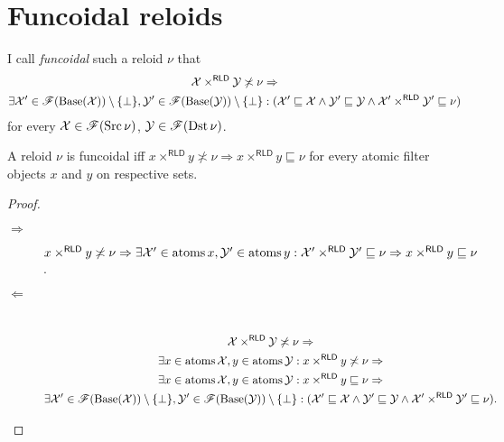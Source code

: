\section{\label{fcd-rld}Funcoidal reloids}
\begin{defn}
I call \emph{funcoidal} such a reloid $\nu$
that
\begin{multline*}
\mathcal{X}\times^{\mathsf{RLD}}\mathcal{Y}\not\asymp\nu\Rightarrow\\
\exists\mathcal{X}'\in\mathscr{F}(\operatorname{Base}(\mathcal{X}))\setminus\{\bot\},\mathcal{Y}'\in\mathscr{F}(\operatorname{Base}(\mathcal{Y}))\setminus\{\bot\}:(\mathcal{X}'\sqsubseteq\mathcal{X}\land\mathcal{Y}'\sqsubseteq\mathcal{Y}\land\mathcal{X}'\times^{\mathsf{RLD}}\mathcal{Y}'\sqsubseteq\nu)
\end{multline*}
for every $\mathcal{X}\in\mathscr{F}(\operatorname{Src}\nu)$, $\mathcal{Y}\in\mathscr{F}(\operatorname{Dst}\nu)$.\end{defn}
\begin{prop}
A reloid $\nu$ is funcoidal iff $x\times^{\mathsf{RLD}}y\nasymp\nu\Rightarrow x\times^{\mathsf{RLD}}y\sqsubseteq\nu$
for every atomic filter objects $x$ and $y$ on respective sets.\end{prop}
\begin{proof}
~
\begin{description}
\item [{$\Rightarrow$}] $x\times^{\mathsf{RLD}}y\not\asymp\nu\Rightarrow\exists\mathcal{X}'\in\operatorname{atoms} x,\mathcal{Y}'\in\operatorname{atoms} y:\mathcal{X}'\times^{\mathsf{RLD}}\mathcal{Y}'\sqsubseteq\nu\Rightarrow x\times^{\mathsf{RLD}}y\sqsubseteq\nu$.
\item [{$\Leftarrow$}] ~
\begin{multline*}
\mathcal{X}\times^{\mathsf{RLD}}\mathcal{Y}\not\asymp\nu\Rightarrow\\
\exists x\in\operatorname{atoms}\mathcal{X},y\in\operatorname{atoms}\mathcal{Y}:x\times^{\mathsf{RLD}}y\not\asymp\nu\Rightarrow\\
\exists x\in\operatorname{atoms}\mathcal{X},y\in\operatorname{atoms}\mathcal{Y}:x\times^{\mathsf{RLD}}y\sqsubseteq\nu\Rightarrow\\
\exists\mathcal{X}'\in\mathscr{F}(\operatorname{Base}(\mathcal{X}))\setminus\{\bot\},\mathcal{Y}'\in\mathscr{F}(\operatorname{Base}(\mathcal{Y}))\setminus\{\bot\}:(\mathcal{X}'\sqsubseteq\mathcal{X}\land\mathcal{Y}'\sqsubseteq\mathcal{Y}\land\mathcal{X}'\times^{\mathsf{RLD}}\mathcal{Y}'\sqsubseteq\nu).
\end{multline*}

\end{description}
\end{proof}
